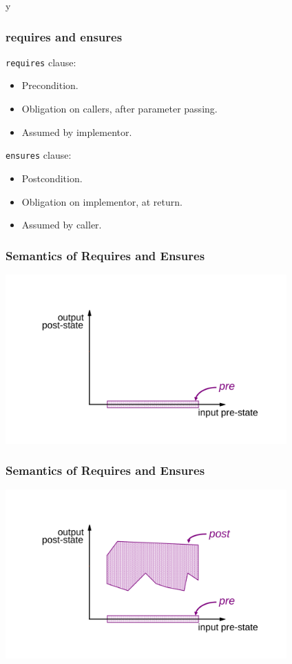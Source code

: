 \if y\MAKEHANDOUTS \documentclass[compress,landscape,handout]{beamer}
\begin{document}
\begin{frame}[fragile]
\frametitle{requires and ensures}

\lstinline!requires! clause:
\begin{itemize}
\item
Precondition.

\item
Obligation on callers, after parameter passing.

\item
Assumed by implementor.
\end{itemize}

\lstinline!ensures! clause:
\begin{itemize}
\item
Postcondition.

\item
Obligation on implementor, at return.

\item
Assumed by caller.
\end{itemize}
\end{frame}

\begin{frame}
\frametitle{Semantics of Requires and Ensures}
\includegraphics[width=4.25in]{requires}
\end{frame}

\begin{frame}
\frametitle{Semantics of Requires and Ensures}
\includegraphics[width=4.25in]{ensures}
\end{frame}
\end{document}
